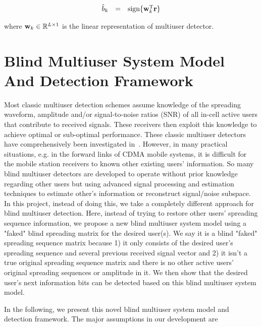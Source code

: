 \documentclass[a4paper,11pt,fleqn]{article}
\newcommand{\br}{{\mathbf r}}
\newcommand{\bw}{{\bf w}}
\begin{document}
\begin{equation}
\begin{array}{rcl}
\hat{b}_k &=& \mbox{sign}\{\bw_k^{\rm T}\br\}
\end{array} \label{linear}
\end{equation}

\noindent where $\bw_k \in \mathbb{R}^{L\times 1}$ is the linear
representation of multiuser detector.

\pagebreak

\section{Blind Multiuser System Model And Detection Framework\label{BMUD_model}}

Most classic multiuser detection schemes assume knowledge of the
spreading waveform, amplitude and/or signal-to-noise ratios (SNR)
of all in-cell active users that contribute to received signals.
These receivers then exploit this knowledge to achieve optimal or
sub-optimal performance. These classic multiuser detectors have
comprehensively been investigated in~\cite{Verd98}. However, in
many practical situations, e.g. in the forward links of CDMA
mobile systems, it is difficult for the mobile station receivers
to known other existing users' information. So many blind
multiuser detectors are developed to operate without prior
knowledge regarding other users but using advanced signal
processing and estimation techniques to estimate other's
information or reconstruct signal/noise subspace. In this project,
instead of doing this, we take a completely different approach for
blind multiuser detection. Here, instead of trying to restore
other users' spreading sequence information, we propose a new
blind multiuser system model using a "faked" blind spreading
matrix for the desired user(s). We say it is a blind "faked"
spreading sequence matrix because 1) it only consists of the
desired user's spreading sequence and several previous received
signal vector and 2) it isn't a true original spreading sequence
matrix and there is no other active users' original spreading
sequences or amplitude in it. We then show that the desired user's
next information bits can be detected based on this blind
multiuser system model.

In the following, we present this novel blind multiuser system
model and detection framework. The major assumptions in our
development are
\end{document}
